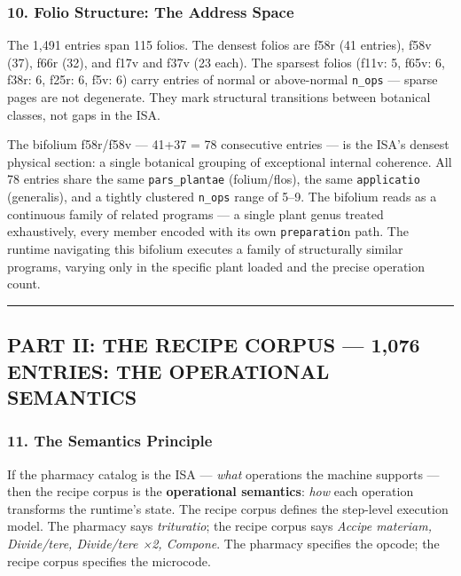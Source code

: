 \documentclass[12pt,a4paper]{article}
\begin{document}
\hypertarget{folio-structure-the-address-space}{%
\subsubsection{10. Folio Structure: The Address
Space}\label{folio-structure-the-address-space}}

The 1,491 entries span 115 folios. The densest folios are f58r (41
entries), f58v (37), f66r (32), and f17v and f37v (23 each). The
sparsest folios (f11v: 5, f65v: 6, f38r: 6, f25r: 6, f5v: 6) carry
entries of normal or above-normal \texttt{n\_ops} --- sparse pages are
not degenerate. They mark structural transitions between botanical
classes, not gaps in the ISA.

The bifolium f58r/f58v --- 41+37 = 78 consecutive entries --- is the
ISA's densest physical section: a single botanical grouping of
exceptional internal coherence. All 78 entries share the same
\texttt{pars\_plantae} (folium/flos), the same \texttt{applicatio}
(generalis), and a tightly clustered \texttt{n\_ops} range of 5--9. The
bifolium reads as a continuous family of related programs --- a single
plant genus treated exhaustively, every member encoded with its own
\texttt{preparatio}n path. The runtime navigating this bifolium executes
a family of structurally similar programs, varying only in the specific
plant loaded and the precise operation count.

\begin{center}\rule{0.5\linewidth}{0.5pt}\end{center}

\hypertarget{part-ii-the-recipe-corpus-1076-entries-the-operational-semantics}{%
\subsection{PART II: THE RECIPE CORPUS --- 1,076 ENTRIES: THE
OPERATIONAL
SEMANTICS}\label{part-ii-the-recipe-corpus-1076-entries-the-operational-semantics}}

\hypertarget{the-semantics-principle}{%
\subsubsection{11. The Semantics
Principle}\label{the-semantics-principle}}

If the pharmacy catalog is the ISA --- \emph{what} operations the
machine supports --- then the recipe corpus is the \textbf{operational
semantics}: \emph{how} each operation transforms the runtime's state.
The recipe corpus defines the step-level execution model. The pharmacy
says \emph{trituratio}; the recipe corpus says \emph{Accipe materiam,
Divide/tere, Divide/tere ×2, Compone}. The pharmacy specifies the
opcode; the recipe corpus specifies the microcode.
\end{document}
